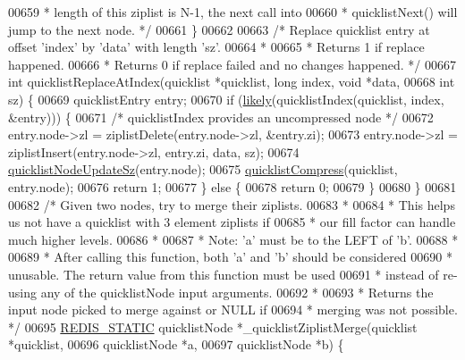 \begin{DoxyCode}
{00659 \textcolor{comment}{     *  length of this ziplist is N-1, the next call into}
00660 \textcolor{comment}{     *  quicklistNext() will jump to the next node. */}
00661 \}
00662 
00663 \textcolor{comment}{/* Replace quicklist entry at offset 'index' by 'data' with length 'sz'.}
00664 \textcolor{comment}{ *}
00665 \textcolor{comment}{ * Returns 1 if replace happened.}
00666 \textcolor{comment}{ * Returns 0 if replace failed and no changes happened. */}
00667 \textcolor{keywordtype}{int} quicklistReplaceAtIndex(quicklist *quicklist, \textcolor{keywordtype}{long} index, \textcolor{keywordtype}{void} *data,
00668                             \textcolor{keywordtype}{int} sz) \{
00669     quicklistEntry entry;
00670     \textcolor{keywordflow}{if} (\hyperlink{quicklist_8c_a217a0bd562b98ae8c2ffce44935351e1}{likely}(quicklistIndex(quicklist, index, &entry))) \{
00671         \textcolor{comment}{/* quicklistIndex provides an uncompressed node */}
00672         entry.node->zl = ziplistDelete(entry.node->zl, &entry.zi);
00673         entry.node->zl = ziplistInsert(entry.node->zl, entry.zi, data, sz);
00674         \hyperlink{quicklist_8c_a03a3947a9423d234923343702619c553}{quicklistNodeUpdateSz}(entry.node);
00675         \hyperlink{quicklist_8c_a4711a946d258d25f4bedace1458a2a1c}{quicklistCompress}(quicklist, entry.node);
00676         \textcolor{keywordflow}{return} 1;
00677     \} \textcolor{keywordflow}{else} \{
00678         \textcolor{keywordflow}{return} 0;
00679     \}
00680 \}
00681 
00682 \textcolor{comment}{/* Given two nodes, try to merge their ziplists.}
00683 \textcolor{comment}{ *}
00684 \textcolor{comment}{ * This helps us not have a quicklist with 3 element ziplists if}
00685 \textcolor{comment}{ * our fill factor can handle much higher levels.}
00686 \textcolor{comment}{ *}
00687 \textcolor{comment}{ * Note: 'a' must be to the LEFT of 'b'.}
00688 \textcolor{comment}{ *}
00689 \textcolor{comment}{ * After calling this function, both 'a' and 'b' should be considered}
00690 \textcolor{comment}{ * unusable.  The return value from this function must be used}
00691 \textcolor{comment}{ * instead of re-using any of the quicklistNode input arguments.}
00692 \textcolor{comment}{ *}
00693 \textcolor{comment}{ * Returns the input node picked to merge against or NULL if}
00694 \textcolor{comment}{ * merging was not possible. */}
00695 \hyperlink{quicklist_8c_a9c22c9c899458021930a552a4f94d317}{REDIS\_STATIC} quicklistNode *\_quicklistZiplistMerge(quicklist *quicklist,
00696                                                    quicklistNode *a,
00697                                                    quicklistNode *b) \{
}
\end{DoxyCode}
